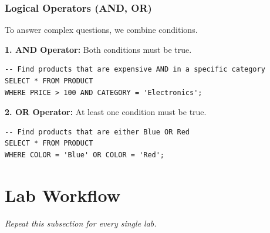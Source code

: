 \documentclass[12pt,a4paper]{article}
\begin{document}
\subsubsection{Logical Operators (AND, OR)}
To answer complex questions, we combine conditions.

\textbf{1. AND Operator:}
Both conditions must be true.
\begin{lstlisting}
-- Find products that are expensive AND in a specific category
SELECT * FROM PRODUCT 
WHERE PRICE > 100 AND CATEGORY = 'Electronics';
\end{lstlisting}

\textbf{2. OR Operator:}
At least one condition must be true.
\begin{lstlisting}
-- Find products that are either Blue OR Red
SELECT * FROM PRODUCT 
WHERE COLOR = 'Blue' OR COLOR = 'Red';
\end{lstlisting}
\newpage
\section*{Lab Workflow}

\textit{Repeat this subsection for every single lab.}
\end{document}

